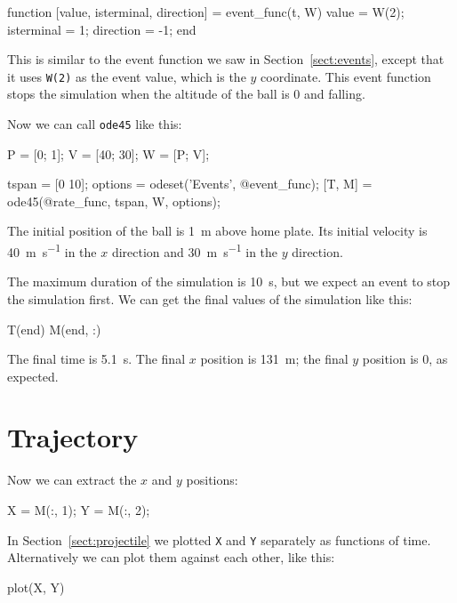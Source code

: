 \documentclass[
]{book}
\numberwithin{Answer}{chapter}
\numberwithin{Exercise}{chapter}
\begin{document}
\begin{code}
function [value, isterminal, direction] = event_func(t, W)
    value = W(2);
    isterminal = 1;
    direction = -1;
end
\end{code}

This is similar to the event function we saw in Section~\ref{sect:events}, except that it uses {\tt W(2)} as the event value, which is the $y$ coordinate.  This event function stops the simulation when the altitude of the ball is 0 and falling.

Now we can call {\tt ode45} like this:

\begin{code}
    P = [0; 1];       %
    V = [40; 30];     %
    W = [P; V];       %
    
    tspan = [0 10];
    options = odeset('Events', @event_func);
    [T, M] = ode45(@rate_func, tspan, W, options);
\end{code}

The initial position of the ball is \SI{1}{\meter} above home plate.  Its initial velocity is \SI{40}{\meter\per\second} in the $x$ direction and \SI{30}{\meter\per\second} in the $y$ direction.

The maximum duration of the simulation is \SI{10}{\second}, but we expect an event to stop the simulation first.  We can get the final values of the simulation like this:
    
\begin{code}
    T(end)
    M(end, :)
\end{code}

The final time is \SI{5.1}{\second}.  The final $x$ position is \SI{131}{\meter}; the final $y$ position is 0, as expected.


\section{Trajectory}

Now we can extract the $x$ and $y$ positions:

\begin{code}
    X = M(:, 1);
    Y = M(:, 2);
\end{code}

In Section~\ref{sect:projectile} we plotted {\tt X} and {\tt Y} separately as functions of time.  Alternatively we can plot them against each other, like this:

\begin{code}
    plot(X, Y)
\end{code}
\end{document}
